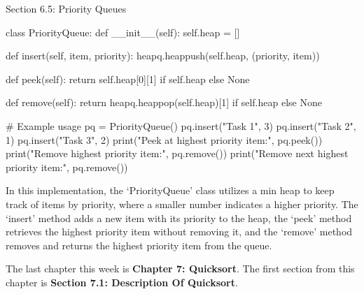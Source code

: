 \begin{notes}{Section 6.5: Priority Queues}
\begin{highlight}
\begin{code}[Python]
    class PriorityQueue:
        def __init__(self):
            self.heap = []
        
        def insert(self, item, priority):
            heapq.heappush(self.heap, (priority, item))
        
        def peek(self):
            return self.heap[0][1] if self.heap else None
        
        def remove(self):
            return heapq.heappop(self.heap)[1] if self.heap else None
    
    # Example usage
    pq = PriorityQueue()
    pq.insert("Task 1", 3)
    pq.insert("Task 2", 1)
    pq.insert("Task 3", 2)
    print("Peek at highest priority item:", pq.peek())
    print("Remove highest priority item:", pq.remove())
    print("Remove next highest priority item:", pq.remove())
    \end{code}
        
        In this implementation, the `PriorityQueue' class utilizes a min heap to keep track of items by priority, where a smaller number indicates a higher priority. The `insert' method adds a new item 
        with its priority to the heap, the `peek' method retrieves the highest priority item without removing it, and the `remove' method removes and returns the highest priority item from the queue.
    \end{highlight}    
\end{notes}

The last chapter this week is \textbf{Chapter 7: Quicksort}. The first section from this chapter is \textbf{Section 7.1: Description Of Quicksort}.

